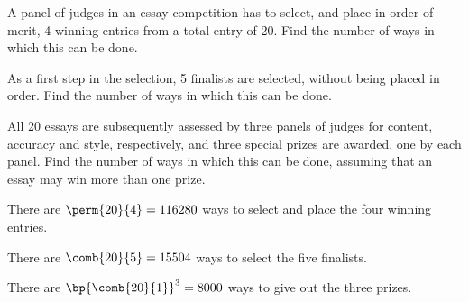 \begin{problem}
    A panel of judges in an essay competition has to select, and place in order of merit, 4 winning entries from a total entry of 20. Find the number of ways in which this can be done.

    As a first step in the selection, 5 finalists are selected, without being placed in order. Find the number of ways in which this can be done.
    
    All 20 essays are subsequently assessed by three panels of judges for content, accuracy and style, respectively, and three special prizes are awarded, one by each panel. Find the number of ways in which this can be done, assuming that an essay may win more than one prize.
\end{problem}
\begin{solution}
    There are $\perm{20}{4} = 116280$ ways to select and place the four winning entries.

    There are $\comb{20}{5} = 15504$ ways to select the five finalists.

    There are $\bp{\comb{20}{1}}^3 = 8000$ ways to give out the three prizes.
\end{solution}

